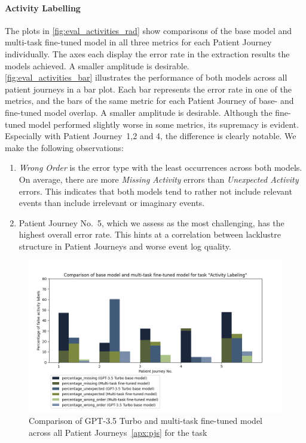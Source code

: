 \paragraph{Activity Labelling} The plots in \autoref{fig:eval_activities_rad} show comparisons of the base model and multi-task fine-tuned model in all three metrics for each Patient Journey individually. The axes each display the error rate in the extraction results the models achieved. A smaller amplitude is desirable.\\
\autoref{fig:eval_activities_bar} illustrates the performance of both models across all patient journeys in a bar plot. Each bar represents the error rate in one of the metrics, and the bars of the same metric for each Patient Journey of base- and fine-tuned model overlap. A smaller amplitude is desirable. Although the fine-tuned model performed slightly worse in some metrics, its supremacy is evident. Especially with Patient Journey~1,2 and 4, the difference is clearly notable. We make the following observations:
\begin{enumerate}
    \item \emph{Wrong Order} is the error type with the least occurrences across both models. On average, there are more \emph{Missing Activity} errors than \emph{Unexpected Activity} errors. This indicates that both models tend to rather not include relevant events than include irrelevant or imaginary events.
    \item Patient Journey No.~5, which we assess as the most challenging, has the highest overall error rate. This hints at a correlation between lacklustre structure in Patient Journeys and worse event log quality.
\end{enumerate}

\begin{figure}[!htb]
    \centering
    \captionsetup{belowskip=0pt,aboveskip=0pt}
    \includegraphics[width=\textwidth]{bachelor_thesis/images/activities_all.png}
    \caption{Comparison of GPT-3.5 Turbo and multi-task fine-tuned model across all Patient Journeys~\ref{apx:pjs} for the task } 
    \label{fig:eval_activities_bar}
\end{figure}
\newpage
